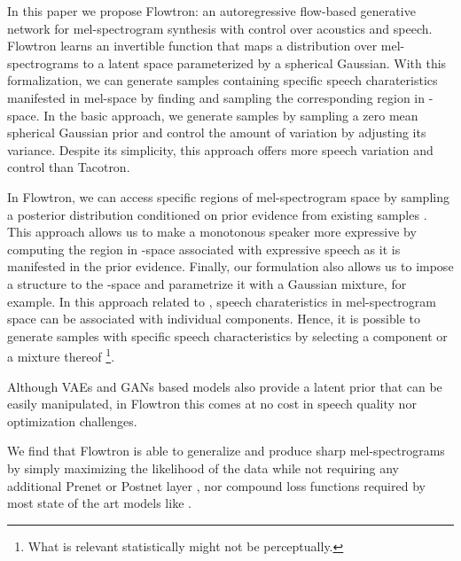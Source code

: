 \documentclass{article}
\begin{document}
In this paper we propose Flowtron: an autoregressive flow-based generative network for mel-spectrogram synthesis with control over acoustics and speech. Flowtron learns an invertible function that maps a distribution over mel-spectrograms to a latent  space parameterized by a spherical Gaussian. With this formalization, we can generate samples containing specific speech charateristics manifested in mel-space by finding and sampling the corresponding region in -space. In the basic approach, we generate samples by sampling a zero mean spherical Gaussian prior and control the amount of variation by adjusting its variance. Despite its simplicity, this approach offers more speech variation and control than Tacotron.

In Flowtron, we can access specific regions of mel-spectrogram space by sampling a posterior distribution conditioned on prior evidence from existing samples \cite{kingma2018glow, gambardella2019transflow}. This approach allows us to make a monotonous speaker more expressive by computing the region in -space associated with expressive speech as it is manifested in the prior evidence. Finally, our formulation also allows us to impose a structure to the -space and parametrize it with a Gaussian mixture, for example. In this approach related to \cite{hsu2018hierarchical}, speech charateristics in mel-spectrogram space can be associated with individual components. Hence, it is possible to generate samples with specific speech characteristics by selecting a component or a mixture thereof \footnote{What is relevant statistically might not be perceptually.}.

Although VAEs and GANs \cite{hsu2018hierarchical,binkowski2019high, akuzawa2018expressive} based models also provide a latent prior that can be easily manipulated, in Flowtron this comes at no cost in speech quality nor optimization challenges.

We find that Flowtron is able to generalize and produce sharp mel-spectrograms by simply maximizing the likelihood of the data while not requiring any additional Prenet or Postnet layer \cite{wang2017tacotron}, nor compound loss functions required by most state of the art models like \cite{shen2017natural,arik2017deep,arik2017deep2,ping2017deep,skerry2018towards, wang2018style,binkowski2019high}.
\end{document}
